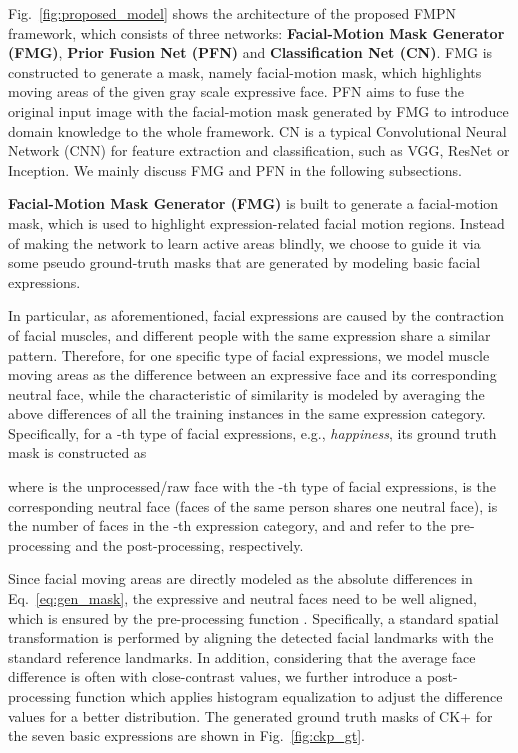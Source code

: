 \documentclass[conference,a4paper]{IEEEtran}
\begin{document}
Fig.~\ref{fig:proposed_model} shows the architecture of the proposed FMPN framework, which consists of three networks: \textbf{Facial-Motion Mask Generator (FMG)}, \textbf{Prior Fusion Net (PFN)} and \textbf{Classification Net (CN)}. FMG is constructed to generate a mask, namely facial-motion mask, which highlights moving areas of the given gray scale expressive face. PFN aims to fuse the original input image with the facial-motion mask generated by FMG to introduce domain knowledge to the whole framework. CN is a typical Convolutional Neural Network (CNN) for feature extraction and classification, such as VGG, ResNet or Inception. We mainly discuss FMG and PFN in the following subsections. 



\textbf{Facial-Motion Mask Generator (FMG)} is built to generate a facial-motion mask, which is used to highlight expression-related facial motion regions. Instead of making the network to learn active areas blindly, we choose to guide it via some pseudo ground-truth masks that are generated by modeling basic facial expressions. 

In particular, as aforementioned, facial expressions are caused by the contraction of facial muscles, and different people with the same expression share a similar pattern. Therefore, for one specific type of facial expressions, we model muscle moving areas as the difference between an expressive face and its corresponding neutral face, while the characteristic of similarity is modeled by averaging the above differences of all the training instances in the same expression category. Specifically, for a -th type of facial expressions, e.g., \textit{happiness}, its ground truth mask  is constructed as

where  is the unprocessed/raw face with the -th type of facial expressions,  is the corresponding neutral face (faces of the same person shares one neutral face),
 is the number of faces in the -th expression category, and  and  refer to the pre-processing and the post-processing, respectively.

Since facial moving areas are directly modeled as the absolute differences in Eq.~\eqref{eq:gen_mask}, the expressive and neutral faces need to be well aligned, which is ensured by the pre-processing function . Specifically, a standard spatial transformation is performed by aligning the detected facial landmarks with the standard reference landmarks. In addition, 
considering that the average face difference is often with close-contrast values, we further introduce a post-processing function  which applies histogram equalization to adjust the difference values for a better distribution. The generated ground truth masks of CK+ \cite{lucey2010extended} for the seven basic expressions are shown in Fig.~\ref{fig:ckp_gt}.
\end{document}
